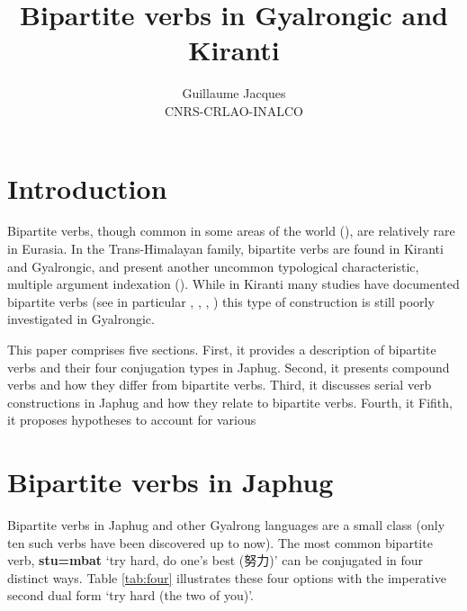\documentclass[oneside,a4paper,11pt]{article}
\newcommand{\ipa}[1]{{\phon\textbf{#1}}}
\newcommand{\zh}[1]{{\cn #1}}
\newcommand{\jpg}[2]{\ipa{#1} `#2'}
\begin{document}
 
\title{Bipartite verbs in Gyalrongic and Kiranti}
\author{Guillaume Jacques\\ CNRS-CRLAO-INALCO}
\maketitle




 \section*{Introduction}
Bipartite verbs, though common in some areas of the world (\citealt{delancey96bipartite}), are relatively rare in Eurasia. In the Trans-Himalayan family, bipartite verbs are found in Kiranti and Gyalrongic, and present another uncommon typological characteristic, 
multiple argument indexation (\citealt{denk15multiple}). While in Kiranti many studies have documented bipartite verbs (see in particular \citealt{driem87}, \citealt{bickel07chintang}, \citealt{doornenbal09}, \citealt{schackow15yakkha}) this type of construction is still poorly investigated in Gyalrongic.

This paper comprises five sections. First, it provides a description of bipartite verbs and their four conjugation types in Japhug. Second, it presents compound verbs and how they differ from bipartite verbs. Third, it discusses serial verb constructions in Japhug and how they relate to bipartite verbs. Fourth, it 
Fifith, it proposes hypotheses to account for various

\section{Bipartite verbs in Japhug} \label{sec:japhug.bipart}

Bipartite verbs in Japhug and other Gyalrong languages are a small class (only ten such verbs have been discovered up to now). 
The most common bipartite verb, \jpg{stu=mbat}{try hard, do one's best (\zh{努力})} can be conjugated in four distinct ways. Table \ref{tab:four} illustrates these four options with the imperative second dual form `try hard (the two of you)'.
\end{document}
